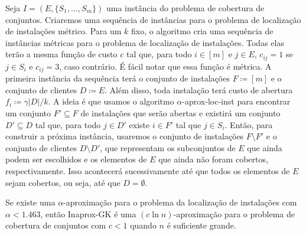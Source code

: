 Seja $I = (E,\{S_1,\ldots,S_m\})$ uma instância do problema de cobertura de conjuntos. Criaremos uma sequência de instâncias para o problema de localização de instalações métrico.
Para um $k$ fixo, o algoritmo cria uma sequência de instâncias métricas para o problema de localização de instalações. Todas elas terão a mesma função de custo $c$ tal que, para todo $i \in [m]$ e $j \in E$, $c_{ij} = 1$ se $j \in S_i$ e $c_{ij}=3$, caso contrário. É fácil notar que essa função é métrica.
A primeira instância da sequência terá o conjunto de instalações $F \coloneqq [m]$ e o conjunto de clientes $D \coloneqq E$. Além disso, toda instalação terá custo de abertura $f_i \coloneqq \gamma |D|/k$. A ideia é que usamos o algoritmo {\sc $\alpha$-aprox-loc-inst} para encontrar um conjunto $F' \subseteq F$ de instalações que serão abertas e existirá um conjunto $D' \subseteq D$ tal que, para todo $j \in D'$ existe $i \in F'$ tal que $j \in S_i$.
Então, para construir a próxima instância, usaremos o conjunto de instalações $F \setminus F'$ e o conjunto de clientes $D\setminus D'$, que representam os subconjuntos de $E$ que ainda podem ser escolhidos e os elementos de $E$ que ainda não foram cobertos, respectivamente.
Isso acontecerá sucessivamente até que todos os elementos de $E$ sejam cobertos, ou seja, até que $D = \emptyset$.

\begin{theorem}
    \label{inaprox}
Se existe uma $\alpha$-aproximação para o problema da localização de instalações com $\alpha < 1.463$, então {\sc Inaprox-GK} é uma $(c \ln n)$-aproximação para o problema de cobertura de conjuntos com $c<1$ quando $n$ é suficiente grande.
\end{theorem}

